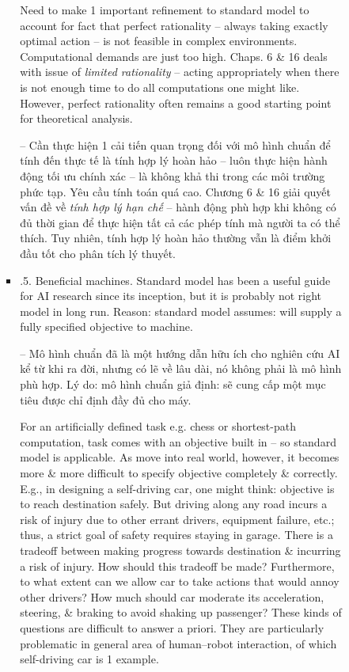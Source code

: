 \documentclass{article}
\begin{document}
\begin{itemize}
\begin{itemize}
\begin{itemize}
\begin{itemize}
				Need to make 1 important refinement to standard model to account for fact that perfect rationality -- always taking exactly optimal action -- is not feasible in complex environments. Computational demands are just too high. Chaps. 6 \& 16 deals with issue of {\it limited rationality} -- acting appropriately when there is not enough time to do all computations one might like. However, perfect rationality often remains a good starting point for theoretical analysis.
				
				-- Cần thực hiện 1 cải tiến quan trọng đối với mô hình chuẩn để tính đến thực tế là tính hợp lý hoàn hảo -- luôn thực hiện hành động tối ưu chính xác -- là không khả thi trong các môi trường phức tạp. Yêu cầu tính toán quá cao. Chương 6 \& 16 giải quyết vấn đề về {\it tính hợp lý hạn chế} -- hành động phù hợp khi không có đủ thời gian để thực hiện tất cả các phép tính mà người ta có thể thích. Tuy nhiên, tính hợp lý hoàn hảo thường vẫn là điểm khởi đầu tốt cho phân tích lý thuyết.				
				\item {.5. Beneficial machines.} Standard model has been a useful guide for AI research since its inception, but it is probably not right model in long run. Reason: standard model assumes: will supply a fully specified objective to machine.
				
				-- Mô hình chuẩn đã là một hướng dẫn hữu ích cho nghiên cứu AI kể từ khi ra đời, nhưng có lẽ về lâu dài, nó không phải là mô hình phù hợp. Lý do: mô hình chuẩn giả định: sẽ cung cấp một mục tiêu được chỉ định đầy đủ cho máy.
								
				For an artificially defined task e.g. chess or shortest-path computation, task comes with an objective built in -- so standard model is applicable. As move into real world, however, it becomes more \& more difficult to specify objective completely \& correctly. E.g., in designing a self-driving car, one might think: objective is to reach destination safely. But driving along any road incurs a risk of injury due to other errant drivers, equipment failure, etc.; thus, a strict goal of safety requires staying in garage. There is a tradeoff between making progress towards destination \& incurring a risk of injury. How should this tradeoff be made? Furthermore, to what extent can we allow car to take actions that would annoy other drivers? How much should car moderate its acceleration, steering, \& braking to avoid shaking up passenger? These kinds of questions are difficult to answer a priori. They are particularly problematic in general area of human--robot interaction, of which self-driving car is 1 example.
				

\end{itemize}
\end{itemize}
\end{itemize}
\end{itemize}
\end{document}
